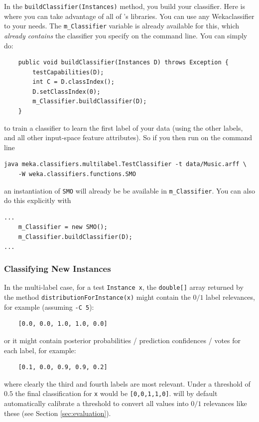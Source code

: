 \documentclass[11pt]{article}
\newcommand{\MEKA}{Meka}
\newcommand{\WEKA}{Weka}
\begin{document}
In the \texttt{buildClassifier(Instances)} method, you build your classifier. Here is where you can take advantage of all of 's libraries. You can use any \WEKA classifier to your needs. The \texttt{m\_Classifier} variable is already available for this, which \textit{already contains} the  classifier you specify on the command line. You can simply do:
{
\lstset{basicstyle=\small\ttfamily,breaklines=true,language=java,frame=L,xleftmargin=\parindent}
\begin{lstlisting}
    public void buildClassifier(Instances D) throws Exception {
        testCapabilities(D);
        int C = D.classIndex();
        D.setClassIndex(0);
        m_Classifier.buildClassifier(D);
    }
\end{lstlisting}
}
to train a classifier to learn the first label of your data (using the other labels, and all other input-space feature attributes). So if you then run on the command line
{
\lstset{basicstyle=\small\ttfamily,breaklines=true,language=java,frame=L,xleftmargin=\parindent}
\begin{lstlisting}
java meka.classifiers.multilabel.TestClassifier -t data/Music.arff \
	-W weka.classifiers.functions.SMO
\end{lstlisting}
}
an instantiation of \texttt{SMO} will already be be available in \texttt{m\_Classifier}. You can also do this explicitly with
{
\lstset{basicstyle=\small\ttfamily,breaklines=true,language=java,frame=L,xleftmargin=\parindent}
\begin{lstlisting}
...
    m_Classifier = new SMO();
    m_Classifier.buildClassifier(D);
...
\end{lstlisting}
}

\subsubsection{Classifying New Instances}

In the multi-label case, for a test \texttt{Instance x}, the \texttt{double[]} array returned by the method \texttt{distributionForInstance(x)} might contain the $0/1$ label relevances, for example (assuming \texttt{-C 5}):
\begin{lstlisting}
	[0.0, 0.0, 1.0, 1.0, 0.0]
\end{lstlisting} 
or it might contain posterior probabilities / prediction confidences / votes for each label, for example:
\begin{lstlisting}
	[0.1, 0.0, 0.9, 0.9, 0.2]
\end{lstlisting} 
where clearly the third and fourth labels are most relevant. Under a threshold of $0.5$ the final classification for \texttt{x} would be \texttt{[0,0,1,1,0]}. \framework{\MEKA} will by default automatically calibrate a threshold to convert all values into $0/1$ relevances like these (see Section \ref{sec:evaluation}). 
\end{document}

